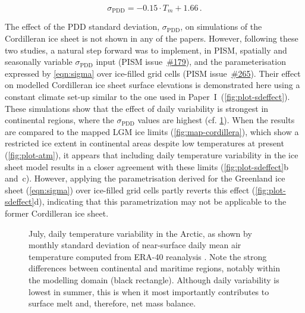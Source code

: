 \documentclass{article}
\newcommand{\sPDD}[0]{\sigma_{\mathrm{PDD}}}
\newcommand{\CCLI}[0]{Paper~I}      %
\newcommand{\issue}[1]{\href{https://github.com/pism/pism/issues/#1}{\##1}}
\begin{document}
\begin{equation}
    \label{eqn:sigma}
    \sPDD = -0.15 \cdot T_{m} + 1.66\,.
\end{equation}

The effect of the PDD standard deviation, $\sPDD$, on simulations of the
Cordilleran ice sheet is not shown in any of the papers. However, following
these two studies, a natural step forward was to implement, in PISM, spatially
and seasonally variable $\sPDD$ input (PISM issue~\issue{179}), and the
parameterisation expressed by \cref{eqn:sigma} over ice-filled grid cells
(PISM issue~\issue{265}). Their effect on modelled Cordilleran ice sheet
surface elevations is demonstrated here using a constant climate set-up similar
to the one used in \CCLI\ (\cref{fig:plot-sdeffect}). These simulations show
that the effect of daily variability is strongest in continental regions, where
the $\sPDD$ values are highest (cf. \cref{fig:plot-sdmap}). When the results
are compared to the mapped LGM ice limits (\cref{fig:map-cordillera}), which show
a restricted ice extent in continental areas despite low temperatures at
present (\cref{fig:plot-atm}), it appears that including daily temperature
variability in the ice sheet model results in a closer agreement with these
limits (\cref{fig:plot-sdeffect}b and~c). However, applying the parametrisation
derived for the Greenland ice sheet (\cref{eqn:sigma}) over ice-filled grid
cells partly reverts this effect (\cref{fig:plot-sdeffect}d), indicating that
this parametrization may not be applicable to the former Cordilleran ice sheet.

\begin{figure}
  \centering
  \caption{July, daily temperature variability in the Arctic, as shown by
           monthly standard deviation of near-surface daily mean air
           temperature computed from ERA-40 reanalysis
           \citep{Uppala.etal.2005}. Note the strong differences between
           continental and maritime regions, notably within the modelling domain
           (black rectangle). Although daily variability is lowest in summer,
           this is when it most importantly contributes to surface melt and,
           therefore, net mass balance.}
  \label{fig:plot-sdmap}
\end{figure}
\end{document}
